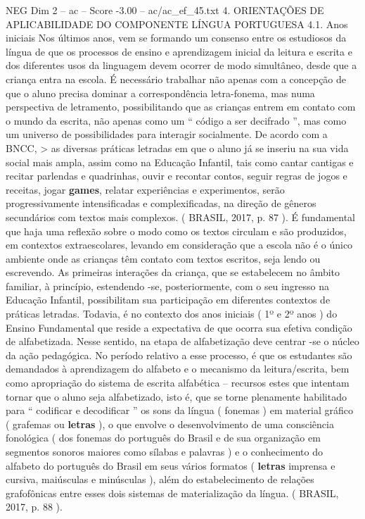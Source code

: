 \begin{textsample}{NEG Dim 2 – ac – Score -3.00 – ac/ac\_ef\_45.txt}  \label{ex:f2_neg_125}
4.
ORIENTAÇÕES DE APLICABILIDADE DO COMPONENTE LÍNGUA PORTUGUESA 4.1.
Anos iniciais Nos últimos anos, vem se formando um consenso entre os estudiosos da língua de que os processos de ensino e aprendizagem inicial da leitura e escrita e dos diferentes usos da linguagem devem ocorrer de modo simultâneo, desde que a criança entra na escola.
É necessário trabalhar não apenas com a concepção de que o aluno precisa dominar a correspondência letra-fonema, mas numa perspectiva de letramento, possibilitando que as crianças entrem em contato com o mundo da escrita, não apenas como um “ código a ser decifrado ”, mas como um universo de possibilidades para interagir socialmente.
De acordo com a BNCC, > as diversas práticas letradas em que o aluno já se inseriu na sua vida social mais ampla, assim como na Educação Infantil, tais como cantar cantigas e recitar parlendas e quadrinhas, ouvir e recontar contos, seguir regras de jogos e receitas, jogar \textbf{games}, relatar experiências e experimentos, serão progressivamente intensificadas e complexificadas, na direção de gêneros secundários com textos mais complexos. ( BRASIL, 2017, p. 87 ).
É fundamental que haja uma reflexão sobre o modo como os textos circulam e são produzidos, em contextos extraescolares, levando em consideração que a escola não é o único ambiente onde as crianças têm contato com textos escritos, seja lendo ou escrevendo.
As primeiras interações da criança, que se estabelecem no âmbito familiar, à princípio, estendendo -se, posteriormente, com o seu ingresso na Educação Infantil, possibilitam sua participação em diferentes contextos de práticas letradas.
Todavia, é no contexto dos anos iniciais ( 1º e 2º anos ) do Ensino Fundamental que reside a expectativa de que ocorra sua efetiva condição de alfabetizada.
Nesse sentido, na etapa de alfabetização deve centrar -se o núcleo da ação pedagógica.
No período relativo a esse processo, é que os estudantes são demandados à aprendizagem do alfabeto e o mecanismo da leitura/escrita, bem como apropriação do sistema de escrita alfabética – recursos estes que intentam tornar que o aluno seja alfabetizado, isto é, que se torne plenamente habilitado para “ codificar e decodificar ” os sons da língua ( fonemas ) em material gráfico ( grafemas ou \textbf{letras} ), o que envolve o desenvolvimento de uma consciência fonológica ( dos fonemas do português do Brasil e de sua organização em segmentos sonoros maiores como sílabas e palavras ) e o conhecimento do alfabeto do português do Brasil em seus vários formatos ( \textbf{letras} imprensa e cursiva, maiúsculas e minúsculas ), além do estabelecimento de relações grafofônicas entre esses dois sistemas de materialização da língua. ( BRASIL, 2017, p. 88 ).

\end{textsample}
